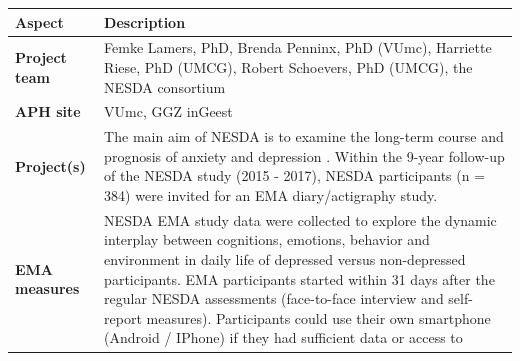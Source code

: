 \documentclass[]{book}
\begin{document}
\begin{longtable}[]{@{}ll@{}}
\toprule
\begin{minipage}[b]{0.25\columnwidth}\raggedright\strut
\textbf{Aspect}\strut
\end{minipage} & \begin{minipage}[b]{0.69\columnwidth}\raggedright\strut
\textbf{Description}\strut
\end{minipage}\tabularnewline
\midrule
\endhead
\begin{minipage}[t]{0.25\columnwidth}\raggedright\strut
\textbf{Project team}\strut
\end{minipage} & \begin{minipage}[t]{0.69\columnwidth}\raggedright\strut
Femke Lamers, PhD, Brenda Penninx, PhD (VUmc), Harriette Riese, PhD
(UMCG), Robert Schoevers, PhD (UMCG), the NESDA consortium\strut
\end{minipage}\tabularnewline
\begin{minipage}[t]{0.25\columnwidth}\raggedright\strut
\textbf{APH site}\strut
\end{minipage} & \begin{minipage}[t]{0.69\columnwidth}\raggedright\strut
VUmc, GGZ inGeest\strut
\end{minipage}\tabularnewline
\begin{minipage}[t]{0.25\columnwidth}\raggedright\strut
\textbf{Project(s)}\strut
\end{minipage} & \begin{minipage}[t]{0.69\columnwidth}\raggedright\strut
The main aim of NESDA is to examine the long-term course and prognosis
of anxiety and depression \citep{Penninx2008}. Within the 9-year
follow-up of the NESDA study (2015 - 2017), NESDA participants (n = 384)
were invited for an EMA diary/actigraphy study.\strut
\end{minipage}\tabularnewline
\begin{minipage}[t]{0.25\columnwidth}\raggedright\strut
\textbf{EMA measures}\strut
\end{minipage} & \begin{minipage}[t]{0.69\columnwidth}\raggedright\strut
NESDA EMA study data were collected to explore the dynamic interplay
between cognitions, emotions, behavior and environment in daily life of
depressed versus non-depressed participants. EMA participants started
within 31 days after the regular NESDA assessments (face-to-face
interview and self-report measures). Participants could use their own
smartphone (Android / IPhone) if they had sufficient data or access to

\end{minipage}
\end{longtable}
\end{document}
